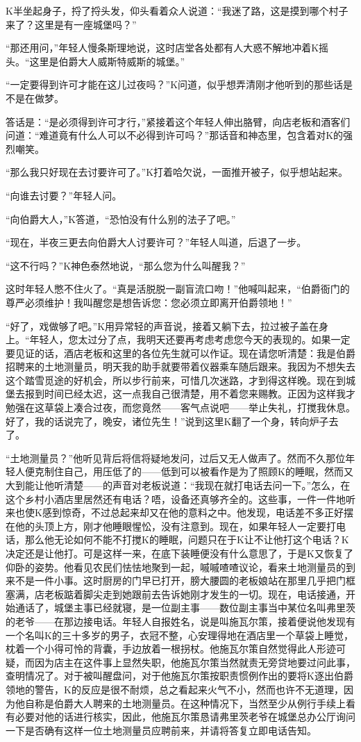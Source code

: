 \documentclass[12pt,a4paper]{article}
\begin{document}
K半坐起身子，捋了捋头发，仰头看着众人说道：“我迷了路，这是摸到哪个村子来了？这里是有一座城堡吗？”

“那还用问，”年轻人慢条斯理地说，这时店堂各处都有人大惑不解地冲着K摇头。“这里是伯爵大人威斯特威斯的城堡。”

“一定要得到许可才能在这儿过夜吗？”K问道，似乎想弄清刚才他听到的那些话是不是在做梦。

答话是：“是必须得到许可才行，”紧接着这个年轻人伸出胳臂，向店老板和酒客们问道：“难道竟有什么人可以不必得到许可吗？”那话音和神态里，包含着对K的强烈嘲笑。

“那么我只好现在去讨要许可了。”K打着哈欠说，一面推开被子，似乎想站起来。

“向谁去讨要？”年轻人问。

“向伯爵大人，”K答道，“恐怕没有什么别的法子了吧。”

“现在，半夜三更去向伯爵大人讨要许可？”年轻人叫道，后退了一步。

“这不行吗？”K神色泰然地说，“那么您为什么叫醒我？”

这时年轻人憋不住火了。“真是活脱脱一副盲流口吻！”他喊叫起来，“伯爵衙门的尊严必须维护！我叫醒您是想告诉您：您必须立即离开伯爵领地！”

“好了，戏做够了吧。”K用异常轻的声音说，接着又躺下去，拉过被子盖在身上。“年轻人，您太过分了点，我明天还要再考虑考虑您今天的表现的。如果一定要见证的话，酒店老板和这里的各位先生就可以作证。现在请您听清楚：我是伯爵招聘来的土地测量员，明天我的助手就要带着仪器乘车随后跟来。我因为不想失去这个踏雪觅途的好机会，所以步行前来，可惜几次迷路，才到得这样晚。现在到城堡去报到时间已经太迟，这一点我自己很清楚，用不着您来赐教。正因为这样我才勉强在这草袋上凑合过夜，而您竟然——客气点说吧——举止失礼，打搅我休息。好了，我的话说完了，晚安，诸位先生！”说到这里K翻了一个身，转向炉子去了。

“土地测量员？”他听见背后将信将疑地发问，过后又无人做声了。然而不久那位年轻人便克制住自己，用压低了的——低到可以被看作是为了照顾K的睡眠，然而又大到能让他听清楚——的声音对老板说道：“我现在就打电话去问一下。”怎么，在这个乡村小酒店里居然还有电话？唔，设备还真够齐全的。这些事，一件一件地听来也使K感到惊奇，不过总起来却又在他的意料之中。他发现，电话差不多正好摆在他的头顶上方，刚才他睡眼惺忪，没有注意到。现在，如果年轻人一定要打电话，那么他无论如何不能不打搅K的睡眠，问题只在于K让不让他打这个电话？K决定还是让他打。可是这样一来，在底下装睡便没有什么意思了，于是K又恢复了仰卧的姿势。他看见农民们怯怯地聚到一起，嘁嘁喳喳议论，看来土地测量员的到来不是一件小事。这时厨房的门早已打开，膀大腰圆的老板娘站在那里几乎把门框塞满，店老板踮着脚尖走到她跟前去告诉她刚才发生的一切。现在，电话接通，开始通话了，城堡主事已经就寝，是一位副主事——数位副主事当中某位名叫弗里茨的老爷——在那边接电话。年轻人自报姓名，说是叫施瓦尔策，接着便说他发现有一个名叫K的三十多岁的男子，衣冠不整，心安理得地在酒店里一个草袋上睡觉，枕着一个小得可怜的背囊，手边放着一根拐杖。他施瓦尔策自然觉得此人形迹可疑，而因为店主在这件事上显然失职，他施瓦尔策当然就责无旁贷地要过问此事，查明情况了。对于被叫醒盘问，对于他施瓦尔策按职责惯例作出的要将K逐出伯爵领地的警告，K的反应是很不耐烦，总之看起来火气不小，然而也许不无道理，因为他自称是伯爵大人聘来的土地测量员。在这种情况下，当然至少从例行手续上看有必要对他的话进行核实，因此，他施瓦尔策恳请弗里茨老爷在城堡总办公厅询问一下是否确有这样一位土地测量员应聘前来，并请将答复立即电话告知。
\end{document}

